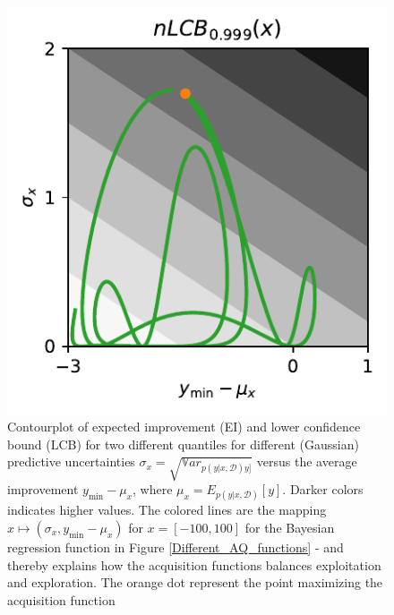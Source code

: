 \begin{figure}[H]
\begin{minipage}[b]{0.32\textwidth}
      \end{minipage}
     \hfill
     \begin{minipage}[b]{0.32\textwidth}
        \includegraphics[trim=0.2cm 0.2cm 0cm 0.1cm,clip,width=\textwidth]{Pictures/neg_lower_confidence_illustration_3.pdf}
      \end{minipage}
    \caption{Contourplot of expected improvement (EI) and lower confidence bound (LCB) for two different
    quantiles for different (Gaussian) predictive uncertainties $\sigma_x =
    \sqrt{\mathbb{V}ar_{p(y|x,\mathcal{D})y]}}$ versus the average improvement $y_{\min}-\mu_x$,
    where $\mu_x = E_{p(y|x,\mathcal{D})}[y]$. Darker colors indicates higher values. The colored lines are the
    mapping $x \mapsto (\sigma_x, y_{\min}-\mu_x)$ for $x = [-100, 100]$ for the Bayesian regression
    function in Figure \ref{Different_AQ_functions} - and thereby explains how the acquisition
    functions balances exploitation and exploration. The orange dot represent the point maximizing
    the acquisition function}
    \label{EI_illustration}
\end{figure}


